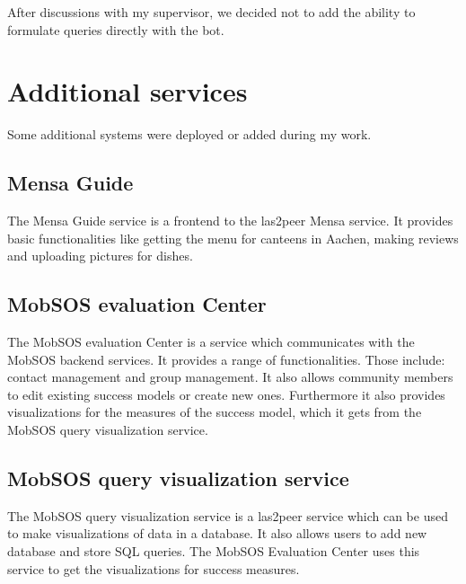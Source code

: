 After discussions with my supervisor, we decided not to add the ability to formulate queries directly with the bot. 




\section{Additional services}\label{sec:additional}
Some additional systems were deployed or added during my work.

\subsection{Mensa Guide}
The Mensa Guide service is a frontend to the las2peer Mensa service. It provides basic functionalities like getting the menu for canteens in Aachen, making reviews and uploading pictures for dishes.  

\subsection{MobSOS evaluation Center}
The MobSOS evaluation Center is a service which communicates with the MobSOS backend services. It provides a range of functionalities. Those include: contact management and group management. 
It also allows community members to edit existing success models or create new ones.
Furthermore it also provides visualizations for the measures of the success model, which it gets from the MobSOS query visualization service.

\subsection{MobSOS query visualization service}
The MobSOS query visualization service is a las2peer service which can be used to make visualizations of data in a database. It also allows users to add new database and store SQL queries. The MobSOS Evaluation Center uses this service to get the visualizations for success measures.





